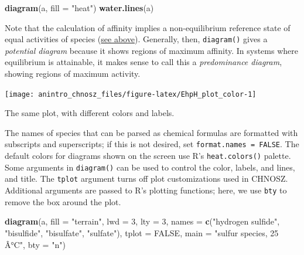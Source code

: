 \documentclass[]{tufte-handout}
\newenvironment{Shaded}{}{}
\newcommand{\KeywordTok}[1]{\textcolor[rgb]{0.00,0.44,0.13}{\textbf{#1}}}
\newcommand{\DataTypeTok}[1]{\textcolor[rgb]{0.56,0.13,0.00}{#1}}
\newcommand{\DecValTok}[1]{\textcolor[rgb]{0.25,0.63,0.44}{#1}}
\newcommand{\StringTok}[1]{\textcolor[rgb]{0.25,0.44,0.63}{#1}}
\newcommand{\OtherTok}[1]{\textcolor[rgb]{0.00,0.44,0.13}{#1}}
\newcommand{\NormalTok}[1]{#1}
\begin{document}
\begin{Shaded}
\begin{Highlighting}[]
\KeywordTok{diagram}\NormalTok{(a, }\DataTypeTok{fill =} \StringTok{"heat"}\NormalTok{)}
\KeywordTok{water.lines}\NormalTok{(a)}
\end{Highlighting}
\end{Shaded}

Note that the calculation of affinity implies a non-equilibrium
reference state of equal activities of species
(\protect\hyperlink{species-of-interest}{see above}). Generally, then,
{\texttt{diagram()}} gives a \emph{potential diagram} because it shows
regions of maximum affinity. In systems where equilibrium is attainable,
it makes sense to call this a \emph{predominance diagram}, showing
regions of maximum activity.

\begin{marginfigure}
\texttt{[image: anintro\_chnosz\_files/figure-latex/EhpH\_plot\_color-1]} \caption[The same plot, with different colors and labels]{The same plot, with different colors and labels.}\label{fig:EhpH_plot_color}
\end{marginfigure}

The names of species that can be parsed as chemical formulas are
formatted with subscripts and superscripts; if this is not desired, set
\texttt{format.names\ =\ FALSE}. The default colors for diagrams shown
on the screen use R's \texttt{heat.colors()} palette. Some arguments in
{\texttt{diagram()}} can be used to control the color, labels, and
lines, and title. The \texttt{tplot} argument turns off plot
customizations used in CHNOSZ. Additional arguments are passed to R's
plotting functions; here, we use \texttt{bty} to remove the box around
the plot.

\begin{Shaded}
\begin{Highlighting}[]
\KeywordTok{diagram}\NormalTok{(a, }\DataTypeTok{fill =} \StringTok{"terrain"}\NormalTok{, }\DataTypeTok{lwd =} \DecValTok{3}\NormalTok{, }\DataTypeTok{lty =} \DecValTok{3}\NormalTok{,}
        \DataTypeTok{names =} \KeywordTok{c}\NormalTok{(}\StringTok{"hydrogen sulfide"}\NormalTok{, }\StringTok{"bisulfide"}\NormalTok{, }\StringTok{"bisulfate"}\NormalTok{, }\StringTok{"sulfate"}\NormalTok{),}
        \DataTypeTok{tplot =} \OtherTok{FALSE}\NormalTok{, }\DataTypeTok{main =} \StringTok{"sulfur species, 25 Â°C"}\NormalTok{, }\DataTypeTok{bty =} \StringTok{"n"}\NormalTok{)}
\end{Highlighting}
\end{Shaded}
\end{document}
